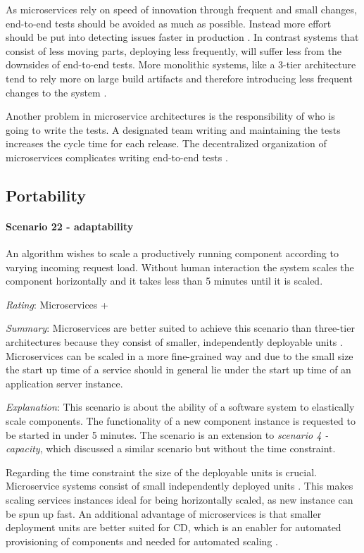 As microservices rely on speed of innovation through frequent and small changes, end-to-end tests should be avoided as much as possible.
Instead more effort should be put into detecting issues faster in production \citep[p. 153]{Newman2015}.
In contrast systems that consist of less moving parts, deploying less frequently, will suffer less from the downsides of end-to-end tests.
More monolithic systems, like a 3-tier architecture tend to rely more on large build artifacts and therefore introducing less frequent changes to the system \citep[p. 105]{Newman2015}.

Another problem in microservice architectures is the responsibility of who is going to write the tests.
A designated team writing and maintaining the tests increases the cycle time for each release.
The decentralized organization of microservices complicates writing end-to-end tests \citep[p. 141]{Newman2015}.

\subsection{Portability}
\label{quaMicro:portability}
\paragraph{Scenario 22 - adaptability}
An algorithm wishes to scale a productively running component according to varying incoming request load. Without human interaction the system scales the component horizontally and it takes less than 5 minutes until it is scaled.
\label{quaMicro:s22}

\textit{Rating}: Microservices +

\textit{Summary}: Microservices are better suited to achieve this scenario than three-tier architectures because they consist of smaller, independently deployable units \citep[p. 5]{Wolff2016} \citep[p. 3]{Newman2015}. 
Microservices can be scaled in a more fine-grained way and due to the small size the start up time of a service should in general lie under the start up time of an application server instance.

\textit{Explanation}:
This scenario is about the ability of a software system to elastically scale components.
The functionality of a new component instance is requested to be started in under 5 minutes. 
The scenario is an extension to \textit{scenario 4 - capacity}, which discussed a similar scenario but without the time constraint.

Regarding the time constraint the size of the deployable units is crucial. 
Microservice systems consist of small independently deployed units \citep[p. 3]{Newman2015}. 
This makes scaling services instances ideal for being horizontally scaled, as new instance can be spun up fast.
An additional advantage of microservices is that smaller deployment units are better suited for \ac{CD}, which is an enabler for automated provisioning of components and needed for automated scaling \citep[p. 5]{Wolff2016}.

